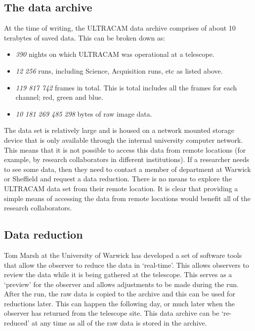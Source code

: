 \subsection{The data archive}
At the time of writing, the ULTRACAM data archive comprises of about 10 terabytes of saved data. This can be broken down as:
\begin{itemize}
	\item \emph{390} nights on which ULTRACAM was operational at a telescope.
	\item \emph{12 256} runs, including Science, Acquisition runs, etc as listed above. 
	\item \emph{119 817 742} frames in total. This is total includes all the frames for each channel; red, green and blue.
	\item \emph{10 181 269 485 298} bytes of raw image data.
\end{itemize} 
The data set is relatively large and is housed on a network mounted storage device that is only available through the internal university computer network. This means that it is not possible to access this data from remote locations (for example, by research collaborators in different institutions). If a researcher needs to see some data, then they need to contact a member of department at Warwick or Sheffield and request a data reduction. There is no means to explore the ULTRACAM data set from their remote location. It is clear that providing a simple means of accessing the data from remote locations would benefit all of the research collaborators. 

\subsection{Data reduction}
Tom Marsh at the University of Warwick has developed a set of software tools that allow the observer to reduce the data in `real-time'. This allows observers to review the data while it is being gathered at the telescope. This serves as a `preview' for the observer and allows adjustments to be made during the run. After the run, the raw data is copied to the archive and this can be used for reductions later. This can happen the following day, or much later when the observer has returned from the telescope site. This data archive can be `re-reduced' at any time as all of the raw data is stored in the archive. 

